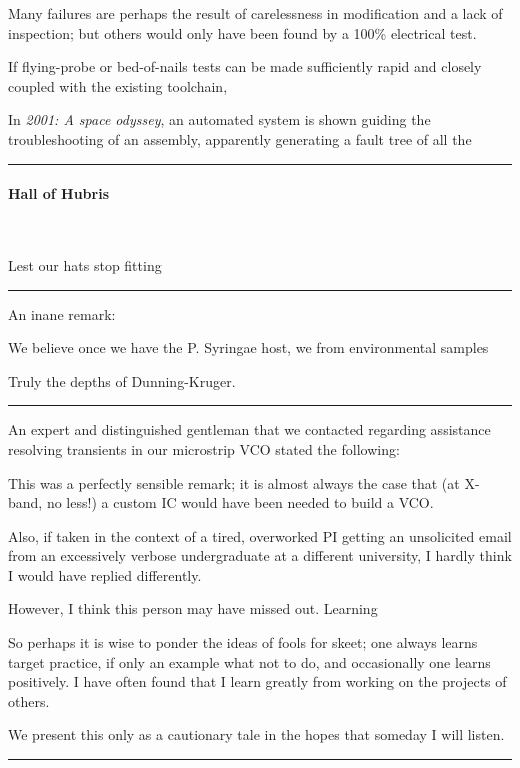 \documentclass[fleqn,10pt]{article}
\begin{document}
\begin{multicols}{1}
Many failures are perhaps the result of carelessness in modification and a lack of inspection; but others would only have been found by a 100\% electrical test.

If flying-probe or bed-of-nails tests can be made sufficiently rapid and closely coupled with the existing toolchain, 

In {\it 2001: A space odyssey}, an automated system is shown guiding the troubleshooting of an assembly, apparently generating a fault tree of all the 

\rule{\linewidth}{0.2pt}



\paragraph{Hall of Hubris} \

Lest our hats stop fitting

\rule{\linewidth}{0.2pt}

An inane remark:

\begin{displayquote}
We believe once we have the P. Syringae host, we from environmental samples
\end{displayquote}

Truly the depths of Dunning-Kruger.

\rule{\linewidth}{0.2pt}

An expert and distinguished gentleman that we contacted regarding assistance resolving transients in our microstrip VCO stated the following:



This was a perfectly sensible remark; it is almost always the case that (at X-band, no less!) a custom IC would have been needed to build a VCO.

Also, if taken in the context of a tired, overworked PI getting an unsolicited email from an excessively verbose undergraduate at a different university, I hardly think I would have replied differently.

However, I think this person may have missed out. Learning 

So perhaps it is wise to ponder the ideas of fools for skeet; one always learns target practice, if only an example what not to do, and occasionally one learns positively. I have often found that I learn greatly from working on the projects of others.

We present this only as a cautionary tale in the hopes that someday I will listen.

\rule{\linewidth}{0.2pt}

\end{multicols}

\end{document}
